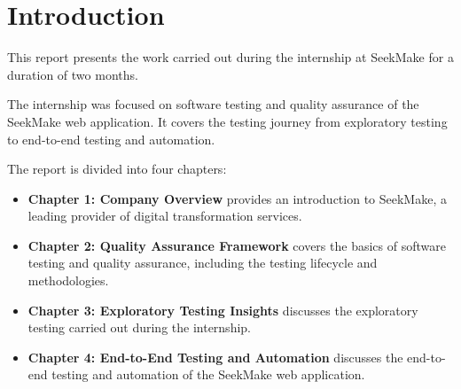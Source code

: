 \chapter*{Introduction}

This report presents the work carried out during the internship at SeekMake for a duration of two months.

The internship was focused on software testing and quality assurance of the SeekMake web application. It covers the testing journey from exploratory testing to end-to-end testing and automation.

The report is divided into four chapters:

\begin{itemize}
    \item \textbf{Chapter 1: Company Overview} provides an introduction to SeekMake, a leading provider of digital transformation services.
    \item \textbf{Chapter 2: Quality Assurance Framework} covers the basics of software testing and quality assurance, including the testing lifecycle and methodologies.
    \item \textbf{Chapter 3: Exploratory Testing Insights} discusses the exploratory testing carried out during the internship.
    \item \textbf{Chapter 4: End-to-End Testing and Automation} discusses the end-to-end testing and automation of the SeekMake web application.
\end{itemize}
